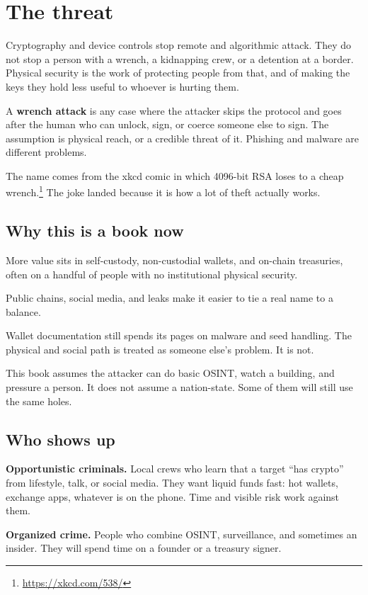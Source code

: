 \chapter{The threat}

Cryptography and device controls stop remote and
algorithmic attack. They do not stop a person with a
wrench, a kidnapping crew, or a detention at a border.
Physical security is the work of protecting people from
that, and of making the keys they hold less useful to
whoever is hurting them.

A \textbf{wrench attack} is any case where the attacker
skips the protocol and goes after the human who can
unlock, sign, or coerce someone else to sign. The
assumption is physical reach, or a credible threat of it.
Phishing and malware are different problems.

The name comes from the xkcd comic in which 4096-bit RSA
loses to a cheap wrench.\footnote{\url{https://xkcd.com/538/}}
The joke landed because it is how a lot of theft actually
works.

\section{Why this is a book now}

More value sits in self-custody, non-custodial wallets,
and on-chain treasuries, often on a handful of people
with no institutional physical security.

Public chains, social media, and leaks make it easier to
tie a real name to a balance.

Wallet documentation still spends its pages on malware
and seed handling. The physical and social path is
treated as someone else's problem. It is not.

This book assumes the attacker can do basic OSINT, watch
a building, and pressure a person. It does not assume a
nation-state. Some of them will still use the same holes.

\section{Who shows up}

\textbf{Opportunistic criminals.} Local crews who learn
that a target ``has crypto'' from lifestyle, talk, or
social media. They want liquid funds fast: hot wallets,
exchange apps, whatever is on the phone. Time and visible
risk work against them.

\textbf{Organized crime.} People who combine OSINT,
surveillance, and sometimes an insider. They will spend
time on a founder or a treasury signer.

